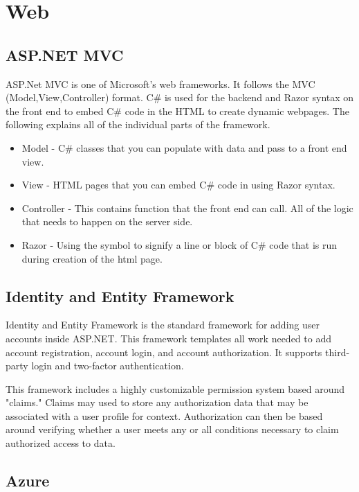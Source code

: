 
\section{Web}

\subsection{ASP.NET MVC}
ASP.Net MVC is one of Microsoft's web frameworks. It follows the MVC (Model,View,Controller) format.
C\# is used for the backend and Razor syntax on the front end to embed C\# code in the HTML to create dynamic webpages.
The following explains all of the individual parts of the framework.

\begin{itemize}
    \item Model - C\# classes that you can populate with data and pass to a front end view.
    \item View - HTML pages that you can embed C\# code in using Razor syntax.
    \item Controller - This contains function that the front end can call. All of the logic that needs to happen on the server side.
    \item Razor - Using the \@ symbol to signify a line or block of C\# code that is run during creation of the html page.
\end{itemize}
\subsection{Identity and Entity Framework}
Identity and Entity Framework is the standard framework for adding user accounts inside ASP.NET. This framework templates all work needed to add account registration, account login, and account authorization. It supports third-party login and two-factor authentication. 

This framework includes a highly customizable permission system based around "claims." Claims may used to store any authorization data that may be associated with a user profile for context. Authorization can then be based around verifying whether a user meets any or all conditions necessary to claim authorized access to data. 

\subsection{Azure}
